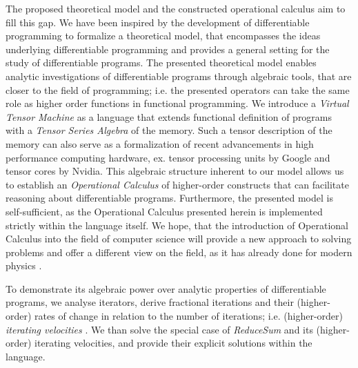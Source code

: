 The proposed theoretical model and the constructed operational calculus aim to
fill this gap. We have been inspired by the development of differentiable programming to
formalize a theoretical model, that encompasses the ideas underlying
differentiable programming and provides a general setting for the study of
differentiable programs. The presented theoretical model enables analytic
investigations of differentiable programs through algebraic tools, that are
closer to the field of programming; i.e. the presented operators can take the
same role as higher order functions in functional programming. We introduce a
\emph{Virtual Tensor Machine} as a language that extends functional definition
of programs with a \emph{Tensor Series Algebra} of the memory. Such a tensor
description of the memory can also serve as a formalization of recent
advancements in high performance computing hardware, ex. tensor processing
units by Google and tensor cores by Nvidia. This algebraic structure inherent
to our model allows us to establish an \emph{Operational Calculus} of
higher-order constructs that can facilitate reasoning about differentiable
programs. Furthermore, the presented model is self-sufficient, as the
Operational Calculus presented herein is implemented strictly within the
language itself. We hope, that the introduction of Operational Calculus into the
field of computer science will provide a new approach to solving problems and offer
a different view on the field, as it has already done for modern physics \cite{OpCalc}.

To demonstrate its algebraic power over analytic properties of
differentiable programs, we analyse iterators, derive fractional iterations and
their (higher-order) rates of change in relation to the number of iterations;
i.e. (higher-order) \emph{ iterating velocities }. We than solve the special
case of \emph{ReduceSum} and its (higher-order) iterating velocities, and
provide their explicit solutions within the language.

